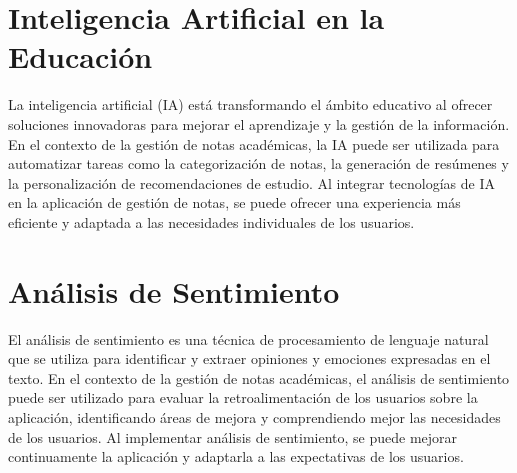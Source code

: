 \section{Inteligencia Artificial en la Educación}
La inteligencia artificial (IA) está transformando el ámbito educativo al ofrecer soluciones innovadoras para mejorar el aprendizaje y la gestión de la información. En el contexto de la gestión de notas académicas, la IA puede ser utilizada para automatizar tareas como la categorización de notas, la generación de resúmenes y la personalización de recomendaciones de estudio. Al integrar tecnologías de IA en la aplicación de gestión de notas, se puede ofrecer una experiencia más eficiente y adaptada a las necesidades individuales de los usuarios.\cite{ia_educacion}
\vspace{1cm}
\section{Análisis de Sentimiento}
El análisis de sentimiento es una técnica de procesamiento de lenguaje natural que se utiliza para identificar y extraer opiniones y emociones expresadas en el texto. En el contexto de la gestión de notas académicas, el análisis de sentimiento puede ser utilizado para evaluar la retroalimentación de los usuarios sobre la aplicación, identificando áreas de mejora y comprendiendo mejor las necesidades de los usuarios. Al implementar análisis de sentimiento, se puede mejorar continuamente la aplicación y adaptarla a las expectativas de los usuarios.\cite{analisis_sentimiento}


